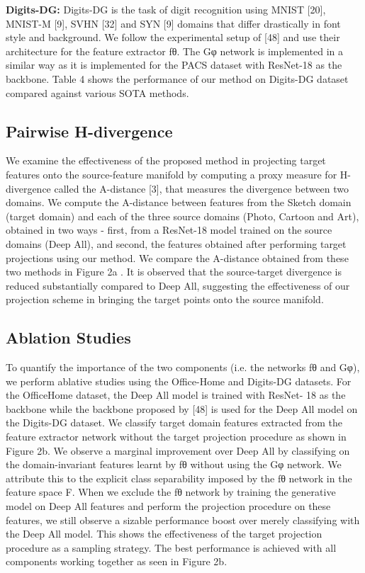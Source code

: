 \documentclass[review]{cvpr}
\begin{document}
\textbf{Digits-DG:} Digits-DG is the task of digit recognition using MNIST [20], MNIST-M [9], SVHN [32] and SYN [9]
domains that differ drastically in font style and background.
We follow the experimental setup of [48] and use their architecture for the feature extractor fθ. The Gφ network
is implemented in a similar way as it is implemented for
the PACS dataset with ResNet-18 as the backbone. Table 4
shows the performance of our method on Digits-DG dataset
compared against various SOTA methods.

\subsection{Pairwise H-divergence}
We examine the effectiveness of the proposed method
in projecting target features onto the source-feature manifold by computing a proxy measure for H-divergence called
the A-distance [3], that measures the divergence between
two domains. We compute the A-distance between features
from the Sketch domain (target domain) and each of the
three source domains (Photo, Cartoon and Art), obtained in
two ways - first, from a ResNet-18 model trained on the
source domains (Deep All), and second, the features obtained after performing target projections using our method.
We compare the A-distance obtained from these two methods in Figure 2a . It is observed that the source-target divergence is reduced substantially compared to Deep All, suggesting the effectiveness of our projection scheme in bringing the target points onto the source manifold.

\subsection{Ablation Studies}
To quantify the importance of the two components (i.e.
the networks fθ and Gφ), we perform ablative studies using
the Office-Home and Digits-DG datasets. For the OfficeHome dataset, the Deep All model is trained with ResNet-
18 as the backbone while the backbone proposed by [48] is
used for the Deep All model on the Digits-DG dataset. We
classify target domain features extracted from the feature
extractor network without the target projection procedure
as shown in Figure 2b. We observe a marginal improvement over Deep All by classifying on the domain-invariant
features learnt by fθ without using the Gφ network. We
attribute this to the explicit class separability imposed by
the fθ network in the feature space F. When we exclude
the fθ network by training the generative model on Deep
All features and perform the projection procedure on these
features, we still observe a sizable performance boost over
merely classifying with the Deep All model. This shows the
effectiveness of the target projection procedure as a sampling strategy. The best performance is achieved with all
components working together as seen in Figure 2b.
\end{document}
